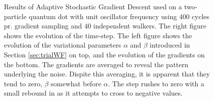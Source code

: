 \begin{figure}[h]
 \begin{center}
  \caption{Results of Adaptive Stochastic Gradient Descent used on a two-particle quantum dot with unit oscillator frequency using $400$ cycles pr. gradient sampling and $40$ independent walkers. The right figure shows the evolution of the time-step. The left figure shows the evolution of the variational parameters $\alpha$ and $\beta$ introduced in Section \ref{sec:trialWF} on top, and the evolution of the gradients on the bottom. The gradients are averaged to reveal the pattern underlying the noise. Dispite this averaging, it is apparent that they tend to zero, $\beta$ somewhat before $\alpha$. The step rushes to zero with a small rebound in  as it attempts to cross to negative values.}
  \label{fig:ASGD_Ex}
 \end{center}
\end{figure}


